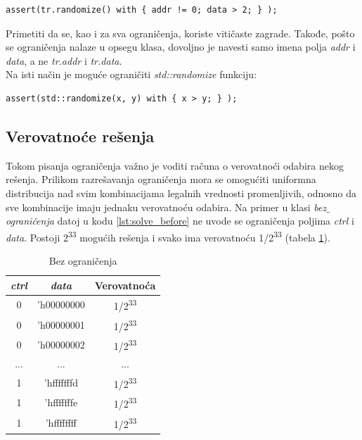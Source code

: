 \begin{lstlisting}
assert(tr.randomize() with { addr != 0; data > 2; } );
\end{lstlisting}

Primetiti da se, kao i za sva ograničenja, koriste vitičaste zagrade. Takođe,
pošto se ograničenja nalaze u opsegu klasa, dovoljno je navesti samo imena polja
\emph{addr} i \emph{data}, a ne \emph{tr.addr} i \emph{tr.data}.\\

Na isti način je moguće ograničiti \emph{std::randomize} funkciju:

\begin{lstlisting}
assert(std::randomize(x, y) with { x > y; } );
\end{lstlisting}


\subsection{Verovatnoće rešenja}

Tokom pisanja ograničenja važno je voditi računa o verovatnoći odabira nekog
rešenja.
Prilikom razrešavanja ograničenja mora se omogućiti uniformna distribucija nad
svim kombinacijama legalnih vrednosti promenljivih, odnosno da sve kombinacije
imaju jednaku verovatnoću odabira.
Na primer u klasi \emph{bez\(\_\)ograničenja} datoj u kodu
\ref{lst:solve_before} ne uvode se ograničenja poljima \emph{ctrl} i
\emph{data}.
Postoji 2\textsuperscript{33} mogućih rešenja i svako ima verovatnoću
1/2\textsuperscript{33} (tabela \ref{tab:unconstrained}).



\begin{table}[!htb]
  \centering
  \begin{tabular}{|c|c|c|}\hline
    \textbf{\emph{ctrl}}&\textbf{\emph{data}}&\textbf{Verovatnoća} \\ \hline
    0&'h00000000&1/2\textsuperscript{33} \\ \hline
    0&'h00000001&1/2\textsuperscript{33} \\ \hline
    0&'h00000002&1/2\textsuperscript{33} \\ \hline
    ...&...&... \\ \hline
    1&'hfffffffd&1/2\textsuperscript{33} \\ \hline
    1&'hfffffffe&1/2\textsuperscript{33} \\ \hline
    1&'hffffffff&1/2\textsuperscript{33} \\ \hline
  \end{tabular}
  \caption{Bez ograničenja}\label{tab:unconstrained}
\end{table}

